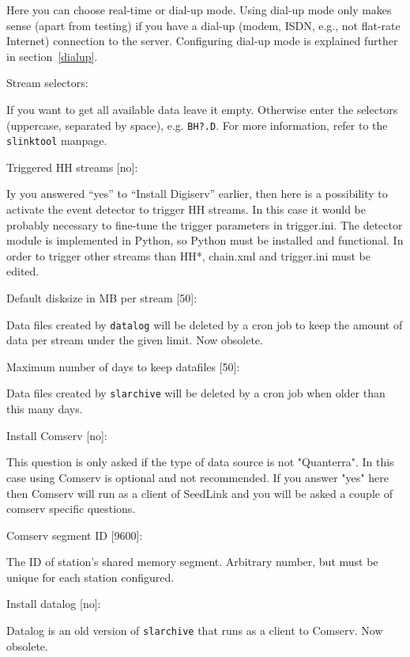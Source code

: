 \documentclass[11pt,a4paper,titlepage]{article}
\begin{document}
\begin{interface}
Here you can choose real-time or dial-up mode. Using dial-up mode only
makes sense (apart from testing) if you have a dial-up (modem, ISDN,
e.g., not flat-rate Internet) connection to the server. Configuring
dial-up mode is explained further in section~\ref{dialup}.

\item Stream selectors:

If you want to get all available data leave it empty. Otherwise enter the
selectors (uppercase, separated by space), e.g. \verb+BH?.D+. For more
information, refer to the \verb+slinktool+ manpage.

\item Triggered HH streams [no]:

Iy you answered ``yes'' to ``Install Digiserv'' earlier, then here is a
possibility to activate the event detector to trigger HH streams. In this
case it would be probably necessary to fine-tune the trigger parameters in
trigger.ini. The detector module is implemented in Python, so Python must
be installed and functional. In order to trigger other streams than HH*,
chain.xml and trigger.ini must be edited.

\item Default disksize in MB per stream [50]:

Data files created by \verb+datalog+ will be deleted by a cron job to keep
the amount of data per stream under the given limit. Now obsolete.

\item Maximum number of days to keep datafiles [50]:

Data files created by \verb+slarchive+ will be deleted by a cron job when
older than this many days.

\item Install Comserv [no]:

This question is only asked if the type of data source is not
"Quanterra".  In this case using Comserv is optional and not
recommended. If you answer "yes" here then Comserv will run as a
client of SeedLink and you will be asked a couple of comserv specific
questions.

\item Comserv segment ID [9600]:

The ID of station's shared memory segment. Arbitrary number, but must be
unique for each station configured.

\item Install datalog [no]:

Datalog is an old version of \verb+slarchive+ that runs as a client to
Comserv.  Now obsolete.


\end{interface}
\end{document}
